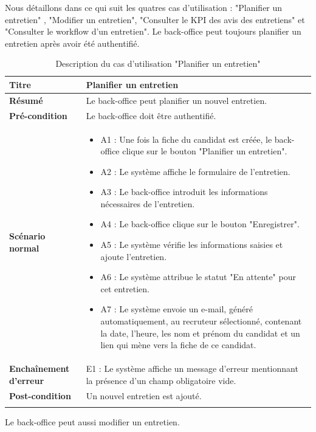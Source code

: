 Nous détaillons dans ce qui suit les quatres cas d'utilisation : "Planifier un entretien" , "Modifier un entretien", "Consulter le KPI des avis des entretiens" et "Consulter le workflow d'un entretien". Le back-office peut toujours planifier un entretien après avoir été authentifié.
\begin{longtable}[c]{
    |p{}|
    |p{}|
}
    \hline
    \textbf{Titre}
    &   Planifier un entretien\\
    \hline
    \textbf{Résumé}
    & Le back-office peut planifier un nouvel entretien. \\
    \hline
     \textbf{Pré-condition}
    & Le back-office doit être authentifié.\\
    \hline
     \textbf{Scénario normal}
    & \begin{itemize}
        \item A1 : Une fois la fiche du candidat est créée, le back-office clique sur le bouton "Planifier un entretien". 
        \item A2 : Le système affiche le formulaire de l'entretien.
        \item A3 : Le back-office introduit les informations nécessaires de l'entretien.
        \item A4 : Le back-office clique sur le bouton "Enregistrer".
        \item A5 : Le système vérifie les informations saisies et ajoute l'entretien.
        \item A6 : Le système attribue le statut "En attente" pour cet entretien.
        \item A7 : Le système envoie un e-mail, généré automatiquement, au recruteur sélectionné, contenant la date, l'heure, les nom et prénom du candidat et un lien qui mène vers la fiche de ce candidat.
    \end{itemize}\\
    \hline
    \textbf{Enchaînement d'erreur}
    & E1 : Le système affiche un message d'erreur mentionnant la présence d'un champ obligatoire vide.\\
    \hline
    \textbf{Post-condition}
    & Un nouvel entretien est ajouté.\\
    \hline
\caption{Description du cas d'utilisation "Planifier un entretien"}
\label{tab:desc_planif_entretien}
\end{longtable} 
Le back-office peut aussi modifier un entretien.
